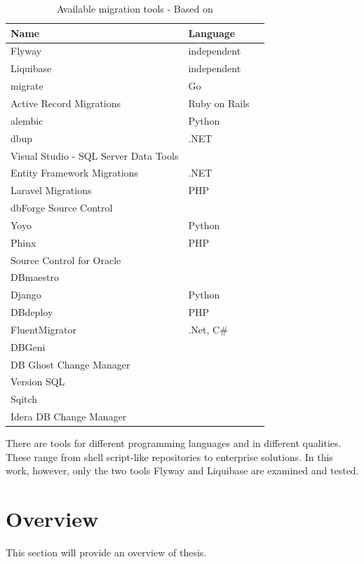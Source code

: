 \begin{table}[H]
	\centering
	\begin{tabularx}{10cm}{X l l}
		\toprule
		Name & Language \\ 
		\midrule
		Flyway & independent \\
		Liquibase & independent \\
		migrate & Go  \\
		Active Record Migrations & Ruby on Rails \\
		alembic & Python \\
		dbup & .NET \\
		Visual Studio - SQL Server Data Tools & \\
		Entity Framework Migrations & .NET \\
		Laravel Migrations & PHP \\
		dbForge Source Control & \\
		Yoyo &  Python\\
		Phinx & PHP\\
		Source Control for Oracle & \\
		DBmaestro &  \\
		Django & Python \\
		DBdeploy & PHP \\
		FluentMigrator & .Net, C\#\\
		DBGeni & \\
		DB Ghost Change Manager & \\
		Version SQL & \\
		Sqitch & \\
		Idera DB Change Manager & \\
	\bottomrule
	\end{tabularx}
	\caption{Available migration tools - Based on \cite{GoogleCloudTools, DBMSTools}}
	\label{tab:migration_tools}
\end{table}

There are tools for different programming languages and in different qualities. These range from shell script-like repositories to enterprise solutions. In this work, however, only the two tools Flyway and Liquibase are examined and tested.




\section{Overview}%
This section will provide an overview of thesis.

